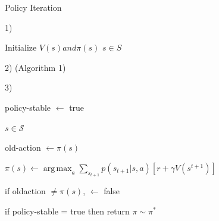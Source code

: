 \documentclass{beamer}
\DeclareMathOperator*{\argmax}{arg\,max}
\begin{document}
\begin{frame}{Policy Iteration}

\begin{algorithm}[H]
\caption{Policy Iteration for estimating $\pi \sim \pi^{*}$}

\vspace{1mm}

1) \textbf{}

Initialize $V(s) and \pi(s)$  $s \in S$
\vspace{3mm}


2) \textbf{} (Algorithm 1)
\vspace{3mm}

3) \textbf{}

\vspace{0.5mm}

\hspace{6mm}policy-stable $\leftarrow$ true 

\vspace{0.5mm}

 \hspace{5mm} \textbf{}  $s \in \mathcal{S}$ \textbf{} 
 
 \vspace{0.4mm}
 
 \hspace{11mm} old-action $\leftarrow \pi(s)$
 
 \vspace{0.5mm}
 
 \hspace{11mm} $\pi(s) \leftarrow \argmax_a \sum_{s_{t+1}} p(s_{t+1}|s,a) [r + \gamma V(s^{t+1})]$
 
 \vspace{0.5mm}
 
 \hspace{11mm} if old\text{-}action $\neq \pi(s)$,  $\leftarrow$ false
 
 \vspace{0.5mm}
 
 \hspace{6mm}if policy-stable = true then return $\pi \sim \pi^{*}$
 

\vspace{1mm}
\end{algorithm}

\end{frame}
\end{document}
